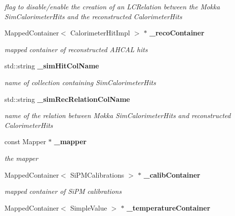 \begin{DoxyCompactItemize}
\begin{DoxyCompactList}\small\item\em flag to disable/enable the creation of an LCRelation between the Mokka SimCalorimeterHits and the reconstructed CalorimeterHits \item\end{DoxyCompactList}\item 
MappedContainer$<$ CalorimeterHitImpl $>$ $\ast$ {\bf \_\-recoContainer}\label{classCALICE_1_1SiPMCalibrateProcessor_ad95f8f4f5a8053e41cd19f10869f6308}

\begin{DoxyCompactList}\small\item\em mapped container of reconstructed AHCAL hits \item\end{DoxyCompactList}\item 
std::string {\bf \_\-simHitColName}\label{classCALICE_1_1SiPMCalibrateProcessor_ace988b5155d638e3a813a7b2a72bbe96}

\begin{DoxyCompactList}\small\item\em name of collection containing SimCalorimeterHits \item\end{DoxyCompactList}\item 
std::string {\bf \_\-simRecRelationColName}\label{classCALICE_1_1SiPMCalibrateProcessor_a919e77aed15f7167dbdc8636341b26ad}

\begin{DoxyCompactList}\small\item\em name of the relation between Mokka SimCalorimeterHits and reconstructed CalorimeterHits \item\end{DoxyCompactList}\item 
const Mapper $\ast$ {\bf \_\-mapper}\label{classCALICE_1_1SiPMCalibrateProcessor_a02bb58794a7bfaade36b8ea48174a4b1}

\begin{DoxyCompactList}\small\item\em the mapper \item\end{DoxyCompactList}\item 
MappedContainer$<$ SiPMCalibrations $>$ $\ast$ {\bf \_\-calibContainer}\label{classCALICE_1_1SiPMCalibrateProcessor_a40e1e74a8da4c3033f4781f466c447fd}

\begin{DoxyCompactList}\small\item\em mapped container of SiPM calibrations \item\end{DoxyCompactList}\item 
MappedContainer$<$ SimpleValue $>$ $\ast$ {\bf \_\-temperatureContainer}\label{classCALICE_1_1SiPMCalibrateProcessor_a1b48a88d42d7f14a0f70b820765b5ade}


\end{DoxyCompactItemize}

